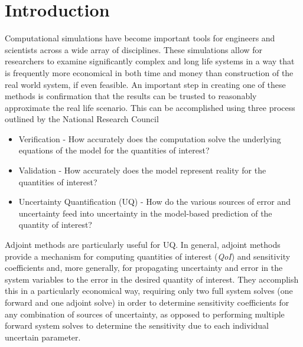 \documentclass[12pt]{report}
\newcommand{\qoi}{{\it QoI}\xspace}
\begin{document}
\section{Introduction}

Computational simulations have become important tools for engineers and scientists across a wide array of disciplines. These simulations allow for researchers to examine significantly complex and long life systems in a way that is frequently more economical in both time and money than construction of the real world system, if even feasible. An important step in creating one of these methods is confirmation that the results can be trusted to reasonably approximate the real life scenario. This can be accomplished using three process outlined by the National Research Council \cite{NRCVVUQ}


\begin{itemize}
\item Verification - How accurately does the computation solve the underlying equations of the model for the quantities of interest?
\item Validation - How accurately does the model represent reality for the quantities of interest?
\item Uncertainty Quantification (UQ) -  How do the various sources of error and uncertainty feed into uncertainty in the model-based prediction of the quantity of interest?
\end{itemize}


Adjoint methods are particularly useful for UQ. In general, adjoint methods provide a mechanism for computing quantities of interest (\qoi) and sensitivity coefficients and, more generally, for propagating uncertainty and error in the system variables to the error in the desired quantity of interest. They accomplish this in a particularly economical way, requiring only two full system solves (one forward and one adjoint solve) in order to determine sensitivity coefficients for any combination of sources of uncertainty, as opposed to performing multiple forward system solves to determine
the sensitivity due to each individual uncertain parameter.
\end{document}
